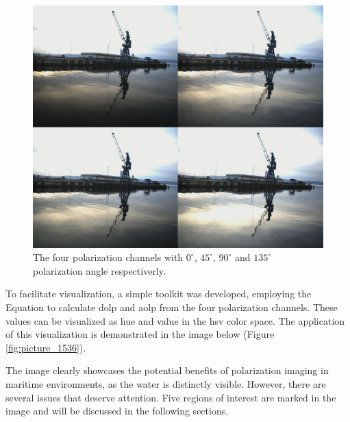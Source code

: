 \begin{figure}[H]
    \includegraphics[width=\textwidth]{figures/pictures/stacked_right_148.jpg}
    \caption{The four polarization channels with $0^\circ$, $45^\circ$, $90^\circ$ and $135^\circ$ polarization angle respectiverly.}
    \label{fig:stacked_pols}
\end{figure}


To facilitate visualization, a simple toolkit was developed, employing the Equation \todo to calculate \gls{dolp} and \gls{aolp} from the four polarization channels.
These values can be visualized as hue and value in the \gls{hsv} color space.
The application of this visualization is demonstrated in the image below (Figure \ref{fig:picture_1536}).

The image clearly showcases the potential benefits of polarization imaging in maritime environments, as the water is distinctly visible.
However, there are several issues that deserve attention.
Five regions of interest are marked in the image and will be discussed in the following sections.


